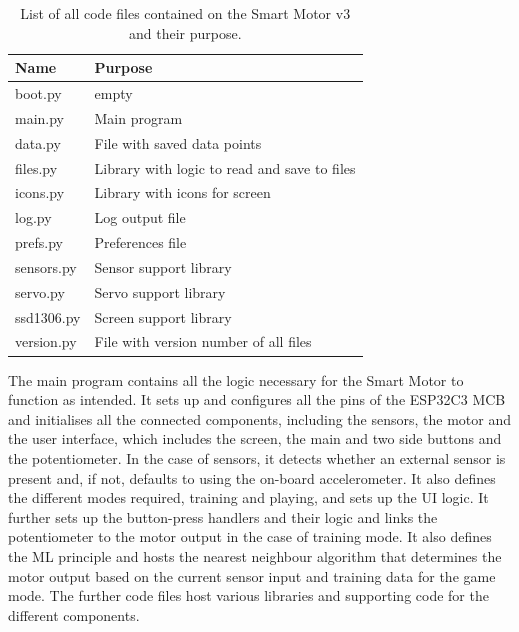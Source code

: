 \begin{table}[H]
    \centering
    \begin{tabular}{|l|l|}
        \hline
        \textbf{Name} & \textbf{Purpose} \\
        \hline
        \hline
        boot.py & empty \\
        \hline
        main.py & Main program \\
        \hline
        \hline
        data.py & File with saved data points \\
        \hline
        files.py & Library with logic to read and save to files \\
        \hline
        icons.py & Library with icons for screen \\
        \hline
        log.py & Log output file \\
        \hline
        prefs.py & Preferences file \\
        \hline
        sensors.py & Sensor support library \\
        \hline
        servo.py & Servo support library \\
        \hline
        ssd1306.py & Screen support library \\
        \hline
        version.py & File with version number of all files \\
        \hline
    \end{tabular}
    \vspace{\ftspace}
    \caption{List of all code files contained on the Smart Motor v3 and their purpose.}
    \label{tab:smv3_code_list}
\end{table}

The main program contains all the logic necessary for the Smart Motor to function as intended. It sets up and configures all the pins of the ESP32C3 MCB and initialises all the connected components, including the sensors, the motor and the user interface, which includes the screen, the main and two side buttons and the potentiometer. In the case of sensors, it detects whether an external sensor is present and, if not, defaults to using the on-board accelerometer. It also defines the different modes required, training and playing, and sets up the UI logic. It further sets up the button-press handlers and their logic and links the potentiometer to the motor output in the case of training mode. It also defines the ML principle and hosts the nearest neighbour algorithm that determines the motor output based on the current sensor input and training data for the game mode.
The further code files host various libraries and supporting code for the different components.

